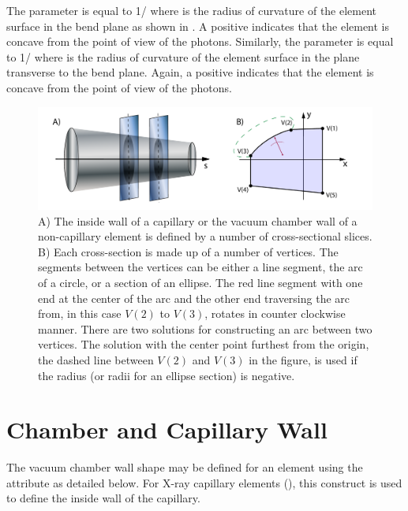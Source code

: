 The  parameter is equal to 1/ where
 is the radius of curvature of the element surface in the
bend plane as shown in . A positive 
indicates that the element is concave from the point of view of the
photons. Similarly, the  parameter is equal to
1/ where  is the radius of curvature of the
element surface in the plane transverse to the bend plane. Again, a
positive  indicates that the element is concave from the
point of view of the photons.


\begin{figure}[tb]
  \centering
  \includegraphics[width=6in]{chamber-wall.pdf}
  \caption[cross-sectional slices of a capillary.]
{A) The inside wall of a capillary or the vacuum chamber wall of a
non-capillary element is defined by a number of cross-sectional
slices.  B) Each cross-section is made up of a number of vertices. The
segments between the vertices can be either a line segment, the arc of
a circle, or a section of an ellipse. The red line segment with one
end at the center of the arc and the other end traversing the arc
from, in this case $V(2)$ to $V(3)$, rotates in counter clockwise
manner. There are two solutions for constructing an arc between two
vertices. The solution with the center point furthest from the origin,
the dashed line between $V(2)$ and $V(3)$ in the figure, is used if
the radius (or radii for an ellipse section) is negative.}
  \label{f:chamber.wall}
\end{figure}

\section{Chamber and Capillary Wall}
\label{s:wall}

The vacuum chamber wall shape may be defined for an element using the
 attribute as detailed below. For X-ray capillary elements
(), this construct is used to define the inside wall
of the capillary.


